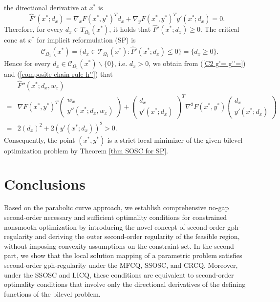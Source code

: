 \documentclass[11pt]{article}
\theoremstyle{definition}
\theoremstyle{remark}
\numberwithin{equation}{section}
\begin{document}
 the directional derivative at $x^*$ is
  $$\widehat{F}'(x^*;d_x)=\nabla_x F(x^*, y^*)^{T} d_x+\nabla_y F(x^*, y^*)^{T}y'(x^*;d_x)=0.$$
  Therefore, for every $d_x\in T_{\Omega_1}(x^*)$, it holds that $\widehat{F}'(x^*;d_x)\ge 0$. The   critical cone  at $x^*$ for implicit   reformulation (SP) is
 \begin{align*}
  & \mathcal{C}_{\Omega_1}(x^*)=  \{d_{x}\in\mathcal{T}_{\Omega_1}(x^*):\widehat{F}'(x^*;d_x)\leq 0\}=\{d_x\ge 0\}.
\end{align*}
Hence for every $d_x\in \mathcal{C}_{\Omega_1}(x^*)\backslash \{0\}$, i.e. $d_x>0$, we obtain  from (\ref{C2 g'= g''=}) and (\ref{composite chain rule h''})  that
  \begin{align*}
   & \widehat{F}''(x^*;d_x,w_x)\\
    =&\nabla F(x^*, y^*)^{T}\left( \begin{array}{c}
                                                         w_x \\
                                                         y''(x^*;d_x,w_x)
                                                       \end{array}\right)+
                                                       \left( \begin{array}{c}
                                                         d_x \\
                                                         y'(x^*;d_x)
                                                       \end{array}\right)^T\nabla^2 F(x^*, y^*)\left( \begin{array}{c}
                                                         d_x \\
                                                         y'(x^*;d_x)
                                                       \end{array}\right)\\
    =&2(d_x)^2+2(y'(x^*;d_x))^2>0.
 \end{align*}
 Consequently, the point $(x^*,y^*)$ is a strict local minimizer of the given bilevel optimization problem  by
 Theorem \ref{thm SOSC for SP}.




\section{Conclusions}\label{section 5}
Based on the parabolic curve approach, we establish comprehensive no-gap second-order necessary and sufficient optimality conditions for constrained nonsmooth optimization by introducing the novel concept of second-order gph-regularity and deriving the outer second-order regularity of the feasible region, without imposing convexity assumptions on the constraint set.
In the second part, we show that the local solution mapping of a parametric problem satisfies second-order gph-regularity under the MFCQ, SSOSC, and CRCQ.
Moreover, under the SSOSC and LICQ, these conditions are equivalent to second-order optimality conditions that involve only the directional derivatives of the defining functions of the bilevel problem.
\end{document}
